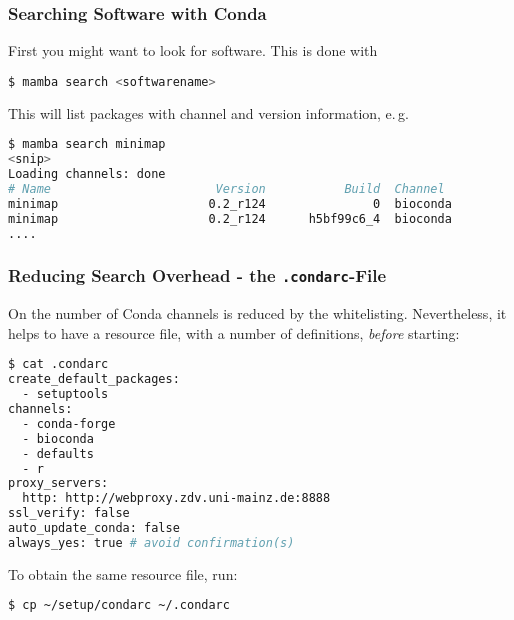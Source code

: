 \begin{frame}[fragile]
  \frametitle{Searching Software with Conda}
  First you might want to look for software. This is done with
  \begin{lstlisting}[language=Bash, style=Shell]
$ mamba search <softwarename>
  \end{lstlisting}
  \pause
  \pause
  This will list packages with channel and version information, e.\,g.
  \begin{lstlisting}[language=Bash, style=Shell, basicstyle=\tiny]
$ mamba search minimap
<snip>
Loading channels: done
# Name                       Version           Build  Channel             
minimap                     0.2_r124               0  bioconda            
minimap                     0.2_r124      h5bf99c6_4  bioconda
....
  \end{lstlisting}
\end{frame}

\begin{frame}[fragile]
  \frametitle{Reducing Search Overhead - the \texttt{.condarc}-File}
  On \mogon{} the number of Conda channels is reduced by the whitelisting. Nevertheless, it helps to have a resource file, with a number of definitions, \emph{before} starting:
  \begin{lstlisting}[language=Bash, style=Shell, basicstyle=\tiny]
$ cat .condarc
create_default_packages:
  - setuptools
channels:
  - conda-forge
  - bioconda
  - defaults
  - r
proxy_servers:
  http: http://webproxy.zdv.uni-mainz.de:8888
ssl_verify: false
auto_update_conda: false
always_yes: true # avoid confirmation(s)
  \end{lstlisting}
  To obtain the same resource file, run:
  \begin{lstlisting}[language=Bash, style=Shell, basicstyle=\footnotesize]
$ cp ~/setup/condarc ~/.condarc
  \end{lstlisting}
\end{frame}

